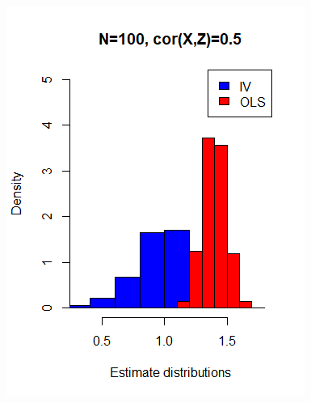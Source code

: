 \documentclass[a4paper,12pt,oneside,English]{article}
\begin{document}
\begin{figure}[p!]
\begin{minipage}[b]{0.5\linewidth}
        \includegraphics[width=\linewidth]{Fig2.png}
    \end{minipage}
    \begin{minipage}[b]{0.5\linewidth}

\end{minipage}
\end{figure}
\end{document}
